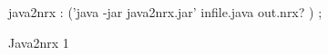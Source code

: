 \begin{figure}[h]
\caption{Java2nrx 1}
\begin{rail}
java2nrx : ('java -jar java2nrx.jar' infile.java out.nrx?  
                )
               ;
\end{rail}
\end{figure}
